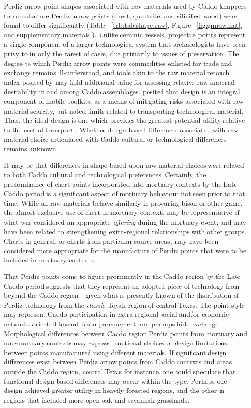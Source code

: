 \documentclass[review]{elsarticle}
\begin{document}
Perdiz arrow point shapes associated with raw materials used by Caddo knappers to manufacture Perdiz arrow points (chert, quartzite, and silicified wood) were found to differ significantly (Table ~\ref{tab:tab.shape.raw}, Figure ~\ref{fig:gmrawmat}, and supplementary materials \citealp{RN8980}). Unlike ceramic vessels, projectile points represent a single component of a larger technological system that archaeologists have been privy to in only the rarest of cases, due primarily to issues of preservation. The degree to which Perdiz arrow points were commodities enlisted for trade and exchange remains ill-understood, and tools akin to the raw material retouch index posited by \citet{RN6541} may hold additional value for assessing relative raw material desirability in and among Caddo assemblages. \citet{RN6363} posited that design is an integral component of mobile toolkits, as a means of mitigating risks associated with raw material scarcity, but noted limits related to transporting technological material. Thus, the ideal design is one which provides the greatest potential utility relative to the cost of transport \citep{RN6363}. Whether design-based differences associated with raw material choice articulated with Caddo cultural or technological differences remains unknown.

It may be that differences in shape based upon raw material choices were related to both Caddo cultural and technological preferences. Certainly, the predominance of chert points incorporated into mortuary contexts by the Late Caddo period is a significant aspect of mortuary behaviour not seen prior to that time. While all raw materials behave similarly in procuring bison or other game, the almost exclusive use of chert in mortuary contexts may be representative of what was considered an appropriate \textit{offering} during the mortuary event; and may have been related to strengthening extra-regional relationships with other groups. Cherts in general, or cherts from particular source areas, may have been considered more appropriate for the manufacture of Perdiz points that were to be included in mortuary contexts.  

That Perdiz points come to figure prominently in the Caddo region by the Late Caddo period suggests that they represent an adopted piece of technology from beyond the Caddo region—given what is presently known of the distribution of Perdiz technology from the \textit{classic} Toyah region of central Texas. The point style may represent Caddo participation in extra regional social and/or economic networks oriented toward bison procurement and perhaps hide exchange \citep{RN9002}. Morphological differences between Caddo region Perdiz points from mortuary and non-mortuary contexts may express functional choices or design limitations between points manufactured using different materials. If significant design differences exist between Perdiz arrow points from Caddo contexts and areas outside the Caddo region, central Texas for instance, one could speculate that functional design-based differences may occur within the type. Perhaps one design achieved greater utility in heavily forested regions, and the other in regions that included more open oak and savannah grasslands.
\end{document}

